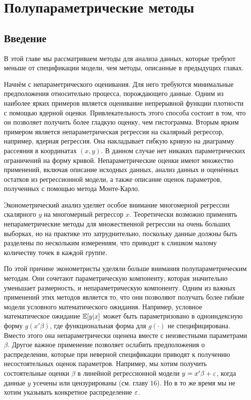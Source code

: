 
\chapter{Полупараметрические методы}
\section{Введение}

В этой главе мы рассматриваем методы для анализа данных, которые требуют меньше от спецификации модели, чем методы, описанные в предыдущих главах.

Начнём с непараметрического оценивания. Для него требуются минимальные предположения относительно процесса, порождающего данные. Одним из наиболее ярких примеров является оценивание непрерывной функции плотности с помощью ядерной оценки. 
Привлекательность этого способа состоит в том, что он позволяет получить более гладкую оценку, чем гистограмма. Вторым ярким примером является непараметрическая регрессия на скалярный регрессор, например, ядерная регрессия. Она накладывает гибкую кривую на диаграмму рассеяния в координатах $(x,y)$. В данном случае нет никаких параметрических ограничений на форму кривой. Непараметрические оценки имеют множество применений, включая описание исходных данных, анализ данных и оценённых остатков из регрессионной модели, а также описание оценок параметров, полученных с помощью метода Монте-Карло.

Эконометрический анализ уделяет особое внимание многомерной регрессии скалярного $y$ на многомерный регрессор $x$. Теоретически возможно применять непараметрические методы для множественной регрессии на очень больших выборках, но на практике это затруднительно, поскольку данные должны быть разделены по нескольким измерениям, что приводит к слишком малому количеству точек в каждой группе.

По этой причине эконометристы уделяли больше внимания полупараметрическим методам. Они сочетают параметрическую компоненту, которая значительно уменьшает размерность, и непараметрическую компоненту. Одним из важных применений этих методов является то, что они позволяют получать более гибкие модели условного математического ожидания. Например, условное математическое ожидание $\mathbb{E}[y|x]$ может быть параметризовано в одноиндексную форму $g(x'\beta)$, где функциональная форма для $g(\cdot)$ не специфицирована. Вместо этого она непараметрически оценена вместе с неизвестными параметрами $\beta$. Другое важное применение позволяет ослабить предположения о распределении, которые при неверной спецификации приводят к получению несостоятельных оценок параметров. Например, мы хотим получить состоятельные оценки $\beta$ в линейной регрессионной модели $y = x'\beta + \varepsilon$, когда данные $y$ усечены или цензурированы (см. главу 16). Но в то же время мы не хотим указывать конкретное распределение $\varepsilon$.

